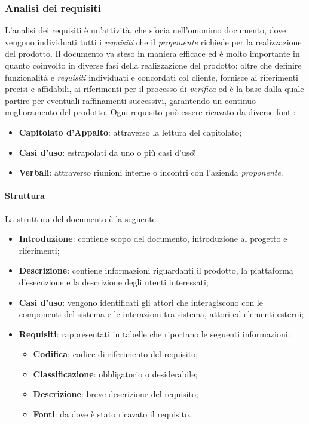 \subsubsection{Analisi dei requisiti}
L'analisi dei requisiti è un'attività, che sfocia nell'omonimo documento, dove vengono individuati tutti i \emph{requisiti} che il \emph{proponente} richiede per la realizzazione del prodotto.\newline{}
Il documento \AdR{} va steso in maniera efficace ed è molto importante in quanto coinvolto in diverse fasi della realizzazione del prodotto: oltre che definire funzionalità e \emph{requisiti} individuati e concordati col cliente, fornisce ai \progrs{} riferimenti precisi e affidabili, ai \verf{} riferimenti per il processo di \emph{verifica} ed è la base dalla quale partire per eventuali raffinamenti successivi, garantendo un continuo miglioramento del prodotto. 
Ogni requisito può essere ricavato da diverse fonti:
\begin{itemize}
	\item \textbf{Capitolato d'Appalto}: attraverso la lettura del capitolato;
	\item \textbf{Casi d'uso}: estrapolati da uno o più casi d'uso\G; 
	\item \textbf{Verbali}: attraverso riunioni interne o incontri con l'azienda \emph{proponente}.
\end{itemize}

\paragraph{Struttura}
La struttura del documento \AdR{} è la seguente:
\begin{itemize}
	\item \textbf{Introduzione}: contiene scopo del documento, introduzione al progetto e riferimenti;
	\item \textbf{Descrizione}: contiene informazioni riguardanti il prodotto, la piattaforma d'esecuzione e la descrizione degli utenti interessati;
	\item \textbf{Casi d'uso}: vengono identificati gli attori che interagiscono con le componenti del sistema e le interazioni tra sistema, attori ed elementi esterni;
	\item \textbf{Requisiti}: rappresentati in tabelle che riportano le seguenti informazioni:
		\begin{itemize}
			\item \textbf{Codifica}: codice di riferimento del requisito;
			\item \textbf{Classificazione}: obbligatorio o desiderabile;
			\item \textbf{Descrizione}: breve descrizione del requisito;
			\item \textbf{Fonti}: da dove è stato ricavato il requisito.
		\end{itemize}
\end{itemize}

